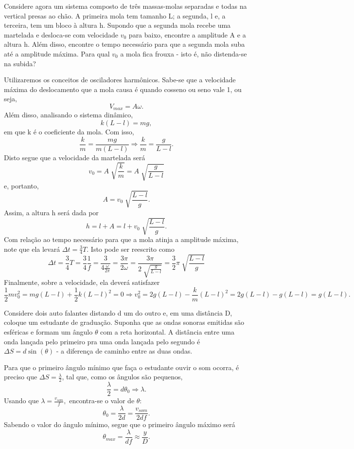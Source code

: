 \documentclass[PhysicsII/phsyicsII_notes.tex]{subfiles}
\begin{document}
\begin{example}
	Considere agora um sistema composto de três massas-molas separadas e todas na vertical presas ao chão. A primeira mola tem tamanho L; a segunda, l e, a terceira,
	tem um bloco à altura h. Supondo que a segunda mola recebe uma martelada e desloca-se com velocidade \(v_{0}\) para baixo, encontre a amplitude A e a altura h. Além disso,
	encontre o tempo necessário para que a segunda mola suba até a amplitude máxima. Para qual \(v_{0}\) a mola fica frouxa - isto é, não distenda-se na subida?

	Utilizaremos os conceitos de osciladores harmônicos. Sabe-se que a velocidade máxima do deslocamento que a mola causa é quando cosseno ou seno vale 1, ou seja,
	\[
		V_{max} = A\omega .
	\]
	Além disso, analisando o sistema dinâmico,
	\[
		k(L-l) = mg,
	\]
	em que k é o coeficiente da mola. Com isso,
	\[
		\frac{k}{m} = \frac{mg}{m(L-l)} \Rightarrow \frac{k}{m} = \frac{g}{L-l}.
	\]
	Disto segue que a velocidade da martelada será
	\[
		v_{0}=A\sqrt[]{\frac{k}{m}} = A\sqrt[]{\frac{g}{L-l}}
	\]
	e, portanto,
	\[
		A = v_{0}\sqrt[]{\frac{L-l}{g}}.
	\]
	Assim, a altura h será dada por
	\[
		h = l + A = l + v_{0}\sqrt[]{\frac{L-l}{g}}.
	\]
	Com relação ao tempo necessário para que a mola atinja a amplitude máxima, note que ela levará \(\Delta t = \frac{3}{4}T\). Isto pode ser reescrito como
	\[
		\Delta t = \frac{3}{4}T = \frac{3}{4}\frac{1}{f} = \frac{3}{4\frac{\omega }{2\pi }} = \frac{3\pi }{2\omega } = \frac{3\pi }{2\sqrt[]{\frac{g}{L-l}}} = \frac{3}{2}\pi \sqrt[]{\frac{L-l}{g}}
	\]
	Finalmente, sobre a velocidade, ela deverá satisfazer
	\[
		\frac{1}{2}mv_{0}^{2} = mg(L-l) + \frac{1}{2}k(L-l)^{2} = 0 \Rightarrow v_{0}^{2} = 2g(L-l) - \frac{k}{m}(L-l)^{2} = 2g(L-l)-g(L-l) = g(L-l).
	\]
\end{example}
\begin{example}
	Considere dois auto falantes distando d um do outro e, em uma distância D, coloque um estudante de graduação. Suponha que as ondas sonoras emitidas são esféricas e formam
	um ângulo \(\theta \) com a reta horizontal. A distância entre uma onda lançada pelo primeiro pra uma onda lançada pelo segundo é \(\Delta S = d\sin^{}{(\theta )}\) - a diferença de caminho entre
	as duas ondas.

	Para que o primeiro ângulo mínimo que faça o estudante ouvir o som ocorra, é preciso que \(\Delta S = \frac{\lambda }{2}\), tal que, como os ângulos são pequenos,
	\[
		\frac{\lambda }{2} = d\theta_{0} \Rightarrow \lambda.
	\]
	Usando que \(\lambda  = \frac{v_{som}}{f},\) encontra-se o valor de \(\theta \):
	\[
		\theta_{0} = \frac{\lambda }{2d} = \frac{v_{som}}{2df}.
	\]
	Sabendo o valor do ângulo mínimo, segue que o primeiro ângulo máximo será
	\[
		\theta_{max} = \frac{\lambda }{df}\approx \frac{y}{D}.
	\]
\end{example}
\end{document}
